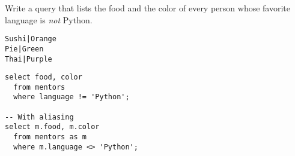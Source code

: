 \begin{blocksection}
\question Write a query that lists the food and the color of every person whose
favorite language is \emph{not} Python.

\begin{lstlisting}
Sushi|Orange
Pie|Green
Thai|Purple
\end{lstlisting}

\begin{solution}[1in]
\begin{lstlisting}
select food, color
  from mentors
  where language != 'Python';
  
-- With aliasing
select m.food, m.color
  from mentors as m
  where m.language <> 'Python';
\end{lstlisting}
\end{solution}
\end{blocksection}
